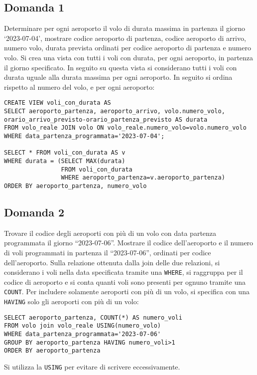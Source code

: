 \documentclass{article}
\numberwithin{equation}{subsection}
\begin{document}
\subsection*{Domanda 1}

Determinare per ogni aeroporto il volo di durata massima in partenza il giorno `2023-07-04', mostrare codice aeroporto di partenza, codice aeroporto di arrivo, 
numero volo, durata prevista ordinati per codice aeroporto di partenza e numero volo. Si crea una vista con tutti i voli con durata, per ogni aeroporto, in partenza 
il giorno specificato. In seguito su questa vista si considerano tutti i voli con durata uguale alla durata massima per ogni aeroporto. In seguito si ordina rispetto 
al numero del volo, e per ogni aeroporto:


\begin{verbatim}
CREATE VIEW voli_con_durata AS
SELECT aeroporto_partenza, aeroporto_arrivo, volo.numero_volo, orario_arrivo_previsto-orario_partenza_previsto AS durata
FROM volo_reale JOIN volo ON volo_reale.numero_volo=volo.numero_volo
WHERE data_partenza_programmata='2023-07-04';

SELECT * FROM voli_con_durata AS v 
WHERE durata = (SELECT MAX(durata)
                FROM voli_con_durata
                WHERE aeroporto_partenza=v.aeroporto_partenza)
ORDER BY aeroporto_partenza, numero_volo
\end{verbatim}

\subsection*{Domanda 2}

Trovare il codice degli aeroporti con più di un volo con data partenza programmata il giorno ``2023-07-06''. Mostrare il codice dell'aeroporto e il numero di voli 
programmati in partenza il ``2023-07-06'', ordinati per codice dell'aeroporto. Sulla relazione ottenuta dalla join delle due relazioni, si considerano i voli nella 
data specificata tramite una \verb|WHERE|, si raggruppa per il codice di aeroporto e si conta quanti voli sono presenti per ognuno tramite una \verb|COUNT|. Per 
includere solamente aeroporti con più di un volo, si specifica con una \verb|HAVING| solo gli aeroporti con più di un volo:

\begin{verbatim}
SELECT aeroporto_partenza, COUNT(*) AS numero_voli
FROM volo join volo_reale USING(numero_volo)
WHERE data_partenza_programmata='2023-07-06'
GROUP BY aeroporto_partenza HAVING numero_voli>1
ORDER BY aeroporto_partenza
\end{verbatim}

Si utilizza la \verb|USING| per evitare di scrivere eccessivamente. 
\end{document}
